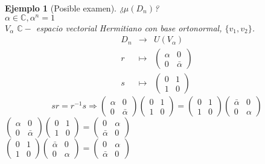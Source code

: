\documentclass[11pt,a4paper]{article}
\theoremstyle{break}
\newtheorem{example}[theorem]{Ejemplo}
\begin{document}
\begin{example}[Posible examen]
¿$\mu(D_{n})$? \\
$\alpha \in \mathbb{C}, \alpha^{n} = 1$ \\
$V_{\alpha}$ $\mathbb{C}-$ espacio vectorial Hermitiano con base ortonormal, $\{v_{1}, v_{2}\}$.
$$\begin{aligned}
D_{n} & \to & U(V_{\alpha}) \\
r & \mapsto & \begin{pmatrix}
\alpha & 0 \\
0 & \bar{\alpha}
\end{pmatrix} \\
s & \mapsto & \begin{pmatrix}
0 & 1 \\
1 & 0
\end{pmatrix}
\end{aligned}$$
$$sr = r^{-1}s \Rightarrow \begin{pmatrix}
\alpha & 0 \\
0 & \bar{\alpha}
\end{pmatrix} \begin{pmatrix}
0 & 1 \\
1 & 0
\end{pmatrix} = \begin{pmatrix}
0 & 1 \\
1 & 0
\end{pmatrix} \begin{pmatrix}
\bar{\alpha} & 0 \\
0 & \alpha
\end{pmatrix}$$
$\begin{pmatrix}
\alpha & 0 \\
0 & \bar{\alpha}
\end{pmatrix} \begin{pmatrix}
0 & 1 \\
1 & 0
\end{pmatrix} = \begin{pmatrix}
0 & \alpha \\
\bar{\alpha} & 0
\end{pmatrix}$ \\
$\begin{pmatrix}
0 & 1 \\
1 & 0
\end{pmatrix} \begin{pmatrix}
\bar{\alpha} & 0 \\
0 & \alpha
\end{pmatrix} = \begin{pmatrix}
0 & \alpha \\
\bar{\alpha} & 0
\end{pmatrix}$


\end{example}
\end{document}
